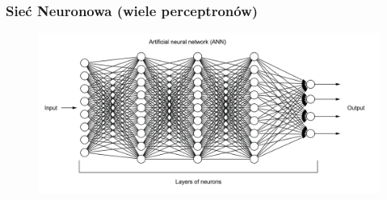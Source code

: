\documentclass[smaller]{beamer}
\begin{document}
\begin{frame}
\frametitle{Sieć Neuronowa (wiele perceptronów)}
    \begin{figure}
        \centering
        \includegraphics[width=\textwidth,height=\textheight,keepaspectratio]{../manifest/mlp.png}
    \end{figure}
\end{frame}

\end{document}
